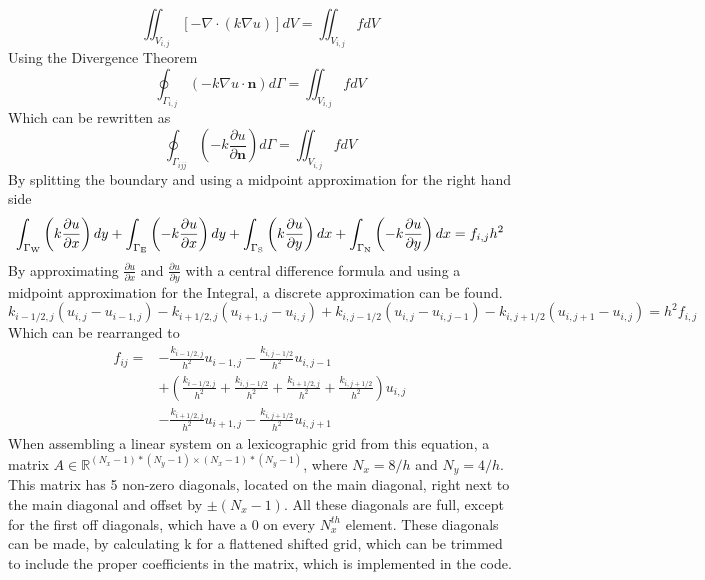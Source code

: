 \documentclass{article}
\begin{document}
\begin{equation}
\iint_{V_{i,j}}[-\nabla \cdot(k \nabla u)] d V=\iint_{V_{i,j}} f d V
\end{equation}
Using the Divergence Theorem
\begin{equation}
\oint_{\Gamma_{i,j}}(-k \nabla u \cdot \mathbf{n}) d \Gamma=\iint_{V_{i,j}} f d V
\end{equation}
Which can be rewritten as
\begin{equation}
\oint_{\Gamma_{ijj}}\left(-k \frac{\partial u}{\partial \mathbf{n}}\right) d \Gamma=\iint_{V_{i,j}} f d V
\end{equation}
By splitting the boundary and using a midpoint approximation for the right hand side
\begin{equation}
\int_{\Gamma_{\mathrm{W}}}\left(k\frac{\partial u}{\partial x}\right) d y+\int_{\Gamma_{\mathrm{E}}}\left(-k \frac{\partial u}{\partial x}\right) d y \\ +\int_{\Gamma_{\mathrm{S}}}\left(k\frac{\partial u}{\partial y}\right) d x+\int_{\Gamma_{\mathrm{N}}}\left(-k \frac{\partial u}{\partial y}\right) d x = f_{i,j}h^2
\end{equation}
By approximating $\frac{\partial u}{\partial x}$ and $\frac{\partial u}{\partial y}$ with a central difference formula and using a midpoint approximation for the Integral, a discrete approximation can be found.
\begin{equation}
k_{i-1 / 2, j} \left(u_{i, j}-u_{i-1, j}\right)- k_{i+1 / 2, j} \left(u_{i+1, j}-u_{i, j}\right)+k_{i, j-1 / 2} \left(u_{i, j}-u_{i, j-1}\right)- k_{i, j+1 / 2} \left(u_{i, j+1}-u_{i, j}\right)=h^2 f_{i,j}
\end{equation}
Which can be rearranged to
\begin{equation}
\begin{aligned}
f_{i j}=&-\frac{k_{i-1 / 2, j}}{h^{2}} u_{i-1, j}-\frac{k_{i, j-1 / 2}}{h^{2}} u_{i, j-1}\\
&+\left(\frac{k_{i-1 / 2, j}}{h^{2}}+\frac{k_{i, j-1 / 2}}{h^{2}}+\frac{k_{i+1 / 2, j}}{h^{2}}+\frac{k_{i, j+1 / 2}}{h^{2}}\right) u_{i, j}\\
&-\frac{k_{i+1 / 2, j}}{h^{2}} u_{i+1, j}-\frac{k_{i, j+1 / 2}}{h^{2}} u_{i, j+1}
\end{aligned}
\end{equation}
When assembling a linear system on a lexicographic grid from this equation, a matrix $A\in\mathbb{R}^{(N_x-1)*(N_y-1)\times(N_x-1)*(N_y-1)}$, where $N_x = 8/h$ and $N_y = 4/h$.
This matrix has 5 non-zero diagonals, located on the main diagonal, right next to the main diagonal and offset by $\pm (N_x-1)$. All these diagonals are full, except for the first off diagonals, which have a 0 on every $N_x^{th}$ element. These diagonals can be made, by calculating k for a flattened shifted  grid, which can be trimmed to include the proper coefficients in the matrix, which is implemented in the code.
\end{document}
